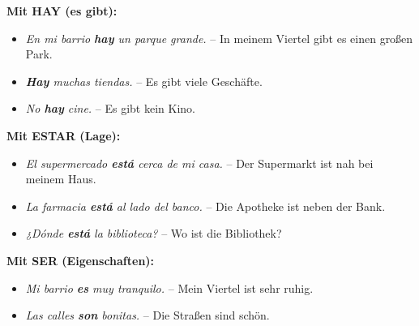 \documentclass[11pt, a4paper]{article}
\begin{document}
\begin{tcolorbox}[
    colback=spanisch!10,
    colframe=spanisch,
    title={\color{white}\bfseries Frases útiles -- Nützliche Sätze},
    fonttitle=\bfseries
]

\textbf{Mit HAY (es gibt):}
\begin{itemize}
    \item \textit{En mi barrio \textbf{hay} un parque grande.} -- In meinem Viertel gibt es einen großen Park.
    \item \textit{\textbf{Hay} muchas tiendas.} -- Es gibt viele Geschäfte.
    \item \textit{No \textbf{hay} cine.} -- Es gibt kein Kino.
\end{itemize}

\textbf{Mit ESTAR (Lage):}
\begin{itemize}
    \item \textit{El supermercado \textbf{está} cerca de mi casa.} -- Der Supermarkt ist nah bei meinem Haus.
    \item \textit{La farmacia \textbf{está} al lado del banco.} -- Die Apotheke ist neben der Bank.
    \item \textit{¿Dónde \textbf{está} la biblioteca?} -- Wo ist die Bibliothek?
\end{itemize}

\textbf{Mit SER (Eigenschaften):}
\begin{itemize}
    \item \textit{Mi barrio \textbf{es} muy tranquilo.} -- Mein Viertel ist sehr ruhig.
    \item \textit{Las calles \textbf{son} bonitas.} -- Die Straßen sind schön.
\end{itemize}

\end{tcolorbox}

\vspace{0.3cm}


\begin{center}
\end{center}
\end{document}
